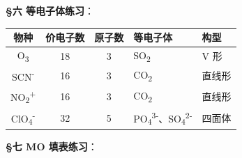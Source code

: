 \textbf{§六 等电子体练习}：

{\def\LTcaptype{none} %
\begin{longtable}[]{@{}cccll@{}}
\toprule\noalign{}
物种 & 价电子数 & 原子数 & 等电子体 & 构型 \\
\midrule\noalign{}
\endhead
\bottomrule\noalign{}
\endlastfoot
O\textsubscript{3} & 18 & 3 & SO\textsubscript{2} & V 形 \\
SCN\textsuperscript{-} & 16 & 3 & CO\textsubscript{2} & 直线形 \\
NO\textsubscript{2}\textsuperscript{+} & 16 & 3 & CO\textsubscript{2} & 直线形 \\
ClO\textsubscript{4}\textsuperscript{-} & 32 & 5 & PO\textsubscript{4}\textsuperscript{3-}、SO\textsubscript{4}\textsuperscript{2-} & 四面体 \\
\end{longtable}
}

\textbf{§七 MO 填表练习}：

